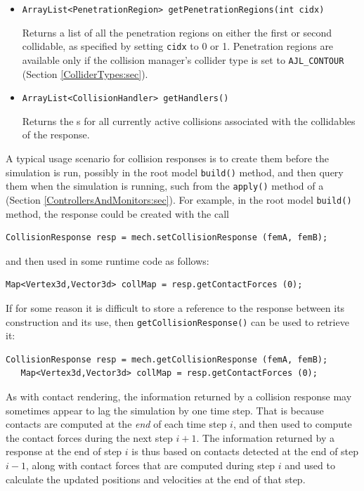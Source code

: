 \begin{itemize}
\item {\tt ArrayList<PenetrationRegion> getPenetrationRegions(int cidx)}

Returns a list of all the penetration regions on either the first or
second collidable, as specified by setting {\tt cidx} to 0 or
1. Penetration regions are available only if the collision manager's
collider type is set to {\tt AJL\_CONTOUR}
(Section \ref{ColliderTypes:sec}).

\item {\tt ArrayList<CollisionHandler> getHandlers()}

Returns the 
s
for all currently active collisions associated with the collidables of
the response.

\end{itemize}

A typical usage scenario for collision responses is to create them
before the simulation is run, possibly in the root model {\tt build()}
method, and then query them when the simulation is running, such from
the {\tt apply()} method of a 
(Section \ref{ControllersAndMonitors:sec}). For example,
in the root model {\tt build()} method, the response
could be created with the call
%
\begin{lstlisting}[]
   CollisionResponse resp = mech.setCollisionResponse (femA, femB);
\end{lstlisting}
%
and then used in some runtime code as follows:
%
\begin{lstlisting}[]
   Map<Vertex3d,Vector3d> collMap = resp.getContactForces (0);
\end{lstlisting}
%
If for some reason it is difficult to store a reference to the
response between its construction and its use, then\pdfbreak
{\tt getCollisionResponse()} can be used to retrieve it:
%
\begin{lstlisting}[]
   CollisionResponse resp = mech.getCollisionResponse (femA, femB);
   Map<Vertex3d,Vector3d> collMap = resp.getContactForces (0);
\end{lstlisting}
%

\begin{sideblock}
As with contact rendering, the information returned by a collision
response may sometimes appear to lag the simulation by one time
step. That is because contacts are computed at the {\it end} of each
time step $i$, and then used to compute the contact forces during the
next step $i+1$. The information returned by a response at the end of
step $i$ is thus based on contacts detected at the end of step $i-1$,
along with contact forces that are computed during step $i$ and used
to calculate the updated positions and velocities at the end of that
step.
\end{sideblock}

